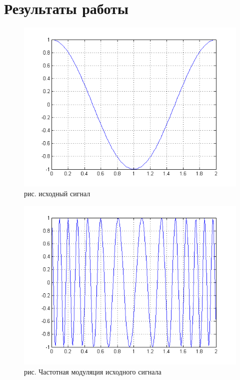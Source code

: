 \documentclass[10pt,a4paper]{report}
\begin{document}
\section{Результаты работы}
\begin{figure}
\begin{center}
\includegraphics[angle=0, scale = 0.8]{8_1}\newline
рис. исходный сигнал\newline
\end{center}
\end{figure}
\begin{figure}
\begin{center}
\includegraphics[angle=0, scale = 0.8]{8_2}\newline
рис. Частотная модуляция исходного сигнала\newline
\end{center}
\end{figure}
\end{document}
